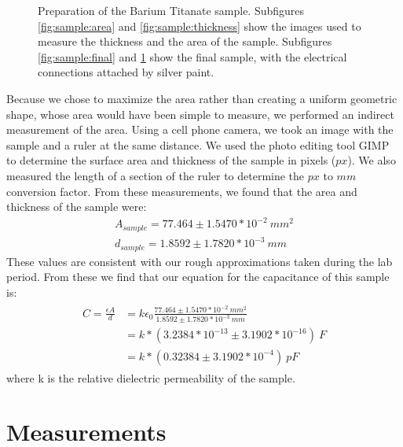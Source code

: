 \documentclass[%
 reprint,
 amsmath,amssymb,
 aps,
 pra,
]{revtex4-1}
\begin{document}
\begin{figure}[H]
\begin{subfigure}{0.22\textwidth}
		\caption{}
		\label{fig:sample:inplace}
	\end{subfigure}
	\caption{Preparation of the Barium Titanate sample. Subfigures \ref{fig:sample:area} and \ref{fig:sample:thickness} show the images used to measure the thickness and the area of the sample. Subfigures \ref{fig:sample:final} and \ref{fig:sample:inplace} show the final sample, with the electrical connections attached by silver paint.}
	\label{fig:sample}
\end{figure}

Because we chose to maximize the area rather than creating a uniform geometric shape, whose area would have been simple to measure, we performed an indirect measurement of the area. Using a cell phone camera, we took an image with the sample and a ruler at the same distance. We used the photo editing tool GIMP to determine the surface area and thickness of the sample in pixels ($px$). We also measured the length of a section of the ruler to determine the $px$ to $mm$ conversion factor. From these measurements, we found that the area and thickness of the sample were:
\begin{gather}
	A_{sample} = 77.464 \pm 1.5470*10^{-2} ~mm^2  \nonumber \\
	d_{sample} = 1.8592 \pm 1.7820*10^{-3} ~mm	 \nonumber
\end{gather}
These values are consistent with our rough approximations taken during the lab period. From these we find that our equation for the capacitance of this sample is:
\begin{gather}
	\begin{align}
		C = \frac{\epsilon A}{d} & = k \epsilon_0 \frac{77.464 \pm 1.5470*10^{-2} ~mm^2}{1.8592 \pm 1.7820*10^{-3} ~mm} \nonumber \\
		& = k*(3.2384*10^{-13} \pm 3.1902*10^{-16})~F \nonumber \\
		& = k*(0.32384 \pm 3.1902*10^{-4})~pF \nonumber
	\end{align}
\end{gather}
where k is the relative dielectric permeability of the sample. 

\section{Measurements}
\end{document}

